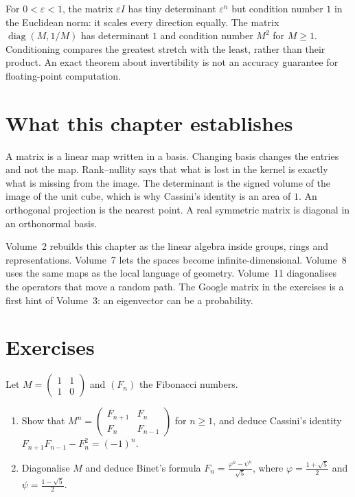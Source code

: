 \begin{reminder}
For $0<\varepsilon<1$, the matrix $\varepsilon I$ has tiny determinant $\varepsilon^n$ but condition number $1$ in the Euclidean norm: it scales every direction equally. The matrix $\operatorname{diag}(M,1/M)$ has determinant $1$ and condition number $M^2$ for $M\ge1$. Conditioning compares the greatest stretch with the least, rather than their product. An exact theorem about invertibility is not an accuracy guarantee for floating-point computation.
\end{reminder}



\section*{What this chapter establishes}
A matrix is a linear map written in a basis. Changing basis changes the entries and not the map. Rank--nullity says that what is lost in the kernel is exactly what is missing from the image. The determinant is the signed volume of the image of the unit cube, which is why Cassini's identity is an area of $1$. An orthogonal projection is the nearest point. A real symmetric matrix is diagonal in an orthonormal basis.

Volume~2 rebuilds this chapter as the linear algebra inside groups, rings and representations. Volume~7 lets the spaces become infinite-dimensional. Volume~8 uses the same maps as the local language of geometry. Volume~11 diagonalises the operators that move a random path. The Google matrix in the exercises is a first hint of Volume~3: an eigenvector can be a probability.

\section{Exercises}

\begin{exercise}[$\star$]\label{ex:fibmat}
Let $M=\begin{pmatrix}1&1\\1&0\end{pmatrix}$ and $(F_n)$ the Fibonacci numbers.
\begin{enumerate}[label=(\alph*)]
\item Show that $M^n=\begin{pmatrix}F_{n+1}&F_n\\F_n&F_{n-1}\end{pmatrix}$ for $n\ge1$, and deduce Cassini's identity $F_{n+1}F_{n-1}-F_n^2=(-1)^n$.
\item Diagonalise $M$ and deduce Binet's formula $F_n=\frac{\varphi^n-\psi^n}{\sqrt5}$, where $\varphi=\frac{1+\sqrt5}2$ and $\psi=\frac{1-\sqrt5}2$.
\end{enumerate}
\end{exercise}


